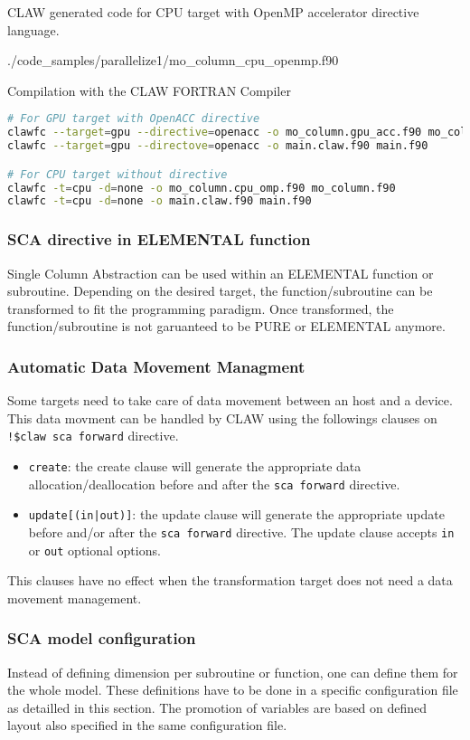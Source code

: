 CLAW generated code for CPU target with OpenMP accelerator directive language.

  {./code_samples/parallelize1/mo_column_cpu_openmp.f90}

Compilation with the CLAW FORTRAN Compiler
\begin{lstlisting}[language=bash]
# For GPU target with OpenACC directive
clawfc --target=gpu --directive=openacc -o mo_column.gpu_acc.f90 mo_column.f90
clawfc --target=gpu --directove=openacc -o main.claw.f90 main.f90

# For CPU target without directive
clawfc -t=cpu -d=none -o mo_column.cpu_omp.f90 mo_column.f90
clawfc -t=cpu -d=none -o main.claw.f90 main.f90
\end{lstlisting}

\subsubsection{SCA directive in ELEMENTAL function}
Single Column Abstraction can be used within an ELEMENTAL function or
subroutine. Depending on the desired target, the function/subroutine can be
transformed to fit the programming paradigm. Once transformed, the
function/subroutine is not garuanteed to be PURE or ELEMENTAL anymore.

\subsubsection{Automatic Data Movement Managment}
Some targets need to take care of data movement between an host and a device.
This data movment can be handled by CLAW using the followings clauses on
\lstinline|!$claw sca forward| directive.%

\begin{itemize}
  \item \lstinline|create|: the create clause will generate the appropriate
        data allocation/deallocation before and after the
        \lstinline|sca forward| directive.
  \item \lstinline!update[(in|out)]!: the update clause will generate the 
        appropriate update before and/or after the \lstinline|sca forward| 
        directive. The update clause accepts \lstinline|in| or \lstinline|out| 
        optional options.
\end{itemize}

This clauses have no effect when the transformation target does not need a
data movement management.

\subsubsection{SCA model configuration}
Instead of defining dimension per subroutine or function, one can define them 
for the whole model. These definitions have to be done in a specific 
configuration file as detailled in this section. The promotion of variables are 
based on defined layout also specified in the same configuration file.

